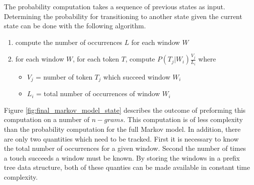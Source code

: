 The probability computation takes a sequence of 
previous states as input.
Determining the probability for transitioning to
another state given the current state can be done
with the following algorithm.
%
\begin{enumerate}
\item compute the number of occurrences $L$ for each window $W$
\item for each window $W$, for each token $T$, compute $P(T_j|W_i)\frac{V_j}{L_i}$ where
  \begin{itemize} 
  \item $V_j$ = number of token $T_j$ which succeed window $W_i$
  \item $L_i$ = total number of occurrences of window $W_i$
  \end{itemize}
\end{enumerate}
%
Figure \ref{fig:final_markov_model_state} 
describes the outcome of 
preforming this computation on a number
of $n-grams$.
%
This computation is of less complexity than 
the probability computation for the full Markov model.
In addition,
there are only two quantities which need to be tracked.
First it is necessary to know the total number of occurrences
for a given window.
Second the number of times a touch succeeds a window must be known. 
%
By storing the windows in a prefix tree data structure,
both of these quanties can be made available in
constant time complexity.


